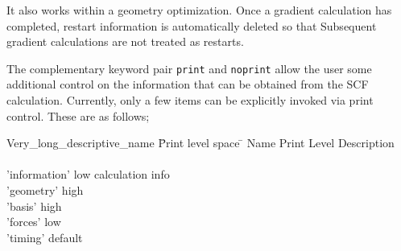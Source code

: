 
  It also works within a geometry optimization. Once a gradient
calculation has completed, restart information is automatically
deleted
so that Subsequent gradient 
  calculations are not treated as restarts.


The complementary keyword pair \verb+print+ and \verb+noprint+ allow the 
user some additional control on the information that can be obtained from
the SCF calculation.  Currently, only a few items can be explicitly invoked
via print control.  These are as follows;
 

\begin{tabbing}
  Very\_long\_descriptive\_name \= Print level space \= \kill
  Name                   \> Print Level \> Description \\
                         \>        \> \\
        'information'   \>        low  \> calculation info\\
        'geometry'    \>          high \> \\
        'basis'        \>         high \> \\
        'forces'   \>             low \> \\
        'timing'   \>             default \> 
\end{tabbing}


